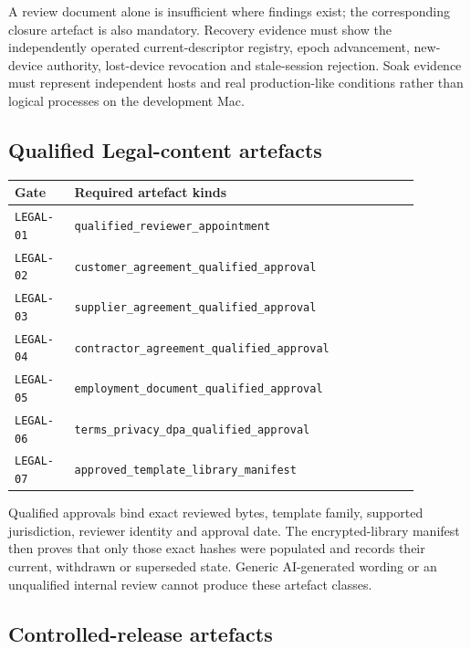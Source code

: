 A review document alone is insufficient where findings exist; the corresponding
closure artefact is also mandatory.  Recovery evidence must show the independently
operated current-descriptor registry, epoch advancement, new-device authority,
lost-device revocation and stale-session rejection.  Soak evidence must represent
independent hosts and real production-like conditions rather than logical processes
on the development Mac.

\subsection{Qualified Legal-content artefacts}

\begin{center}
\begin{tabular}{p{0.13\linewidth}p{0.75\linewidth}}
\hline
\textbf{Gate} & \textbf{Required artefact kinds} \\
\hline
\texttt{LEGAL-01} & \texttt{qualified\_reviewer\_appointment} \\
\texttt{LEGAL-02} & \texttt{customer\_agreement\_qualified\_approval} \\
\texttt{LEGAL-03} & \texttt{supplier\_agreement\_qualified\_approval} \\
\texttt{LEGAL-04} & \texttt{contractor\_agreement\_qualified\_approval} \\
\texttt{LEGAL-05} & \texttt{employment\_document\_qualified\_approval} \\
\texttt{LEGAL-06} & \texttt{terms\_privacy\_dpa\_qualified\_approval} \\
\texttt{LEGAL-07} & \texttt{approved\_template\_library\_manifest} \\
\hline
\end{tabular}
\end{center}

Qualified approvals bind exact reviewed bytes, template family, supported
jurisdiction, reviewer identity and approval date.  The encrypted-library manifest
then proves that only those exact hashes were populated and records their current,
withdrawn or superseded state.  Generic AI-generated wording or an unqualified
internal review cannot produce these artefact classes.

\subsection{Controlled-release artefacts}

